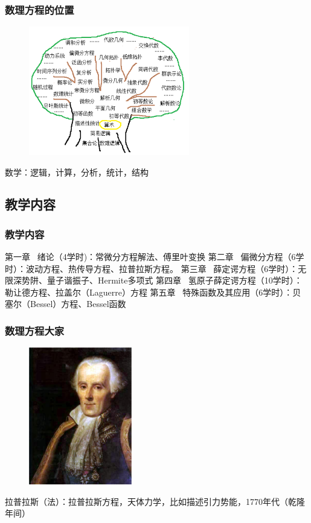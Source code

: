 \begin{frame}
	\frametitle{数理方程的位置}
	\begin{center}
		\begin{figure}
			\includegraphics[width=7cm]{figs/fig1-1.png}	
		\end{figure}
		{ 数学：逻辑，计算，分析，统计，结构}
	\end{center}
\end{frame}

\subsection{教学内容}

\begin{frame}
	\frametitle{教学内容}
	\begin{enumerate}
			\IItem 第一章 ~绪论（4学时)：常微分方程解法、傅里叶变换
			\vspace{0.2cm}
			\IItem 第二章~ 偏微分方程（6学时）：波动方程、热传导方程、拉普拉斯方程。
			\vspace{0.2cm}
			\IItem 第三章 ~薛定谔方程（6学时）：无限深势阱、量子谐振子、Hermite多项式
            \vspace{0.2cm}
            \IItem 第四章 ~氢原子薛定谔方程（10学时）：勒让德方程、拉盖尔（Laguerre）方程
            \vspace{0.2cm}
            \IItem 第五章~ 特殊函数及其应用（6学时）：贝塞尔（Bessel）方程、Bessel函数
     \end{enumerate}	
\end{frame}

\begin{frame}
	\frametitle{数理方程大家}
	\begin{center}
		\begin{figure}
			\includegraphics[width=4.5cm]{figs/fig1-3-1.png}	
		\end{figure}
	\end{center}
	{拉普拉斯（法）：拉普拉斯方程，天体力学，比如描述引力势能，1770年代（乾隆年间）}
\end{frame}

